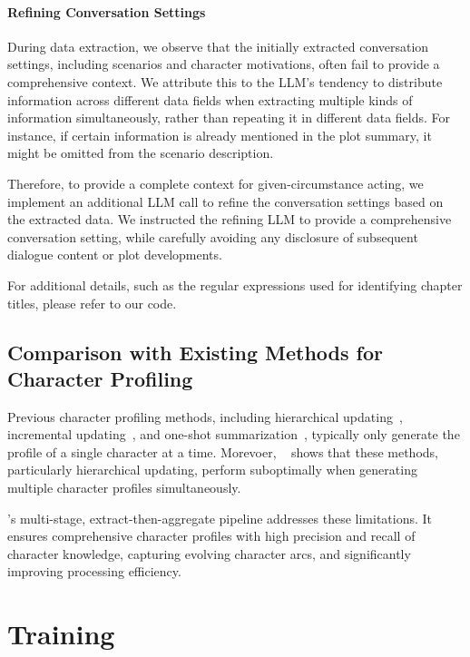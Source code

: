 \paragraph{Refining Conversation Settings} 
During data extraction, we observe that the initially extracted conversation settings, including scenarios and character motivations, often fail to provide a comprehensive context. 
We attribute this to the LLM’s tendency to distribute information across different data fields when extracting multiple kinds of information simultaneously, rather than repeating it in different data fields. 
For instance, if certain information is already mentioned in the plot summary, it might be omitted from the scenario description.

Therefore, to provide a complete context for given-circumstance acting, we implement an additional LLM call to refine the conversation settings based on the extracted data. 
We instructed the refining LLM to provide a comprehensive  conversation setting, while carefully avoiding any disclosure of subsequent dialogue content or plot developments. 


For additional details, such as the regular expressions used for identifying chapter titles, please refer to our  code.

\subsection{Comparison with Existing Methods for Character Profiling}

Previous character profiling methods, including hierarchical updating~\citep{wu2021recursively}, incremental updating~\citep{chang2023booookscore}, and one-shot summarization~\citep{yuan2024evaluating}, typically only generate the profile of a single character at a time. 
Morevoer, ~\citet{papoudakis2024bookworm} shows that these methods, particularly hierarchical updating, perform suboptimally when generating multiple character profiles simultaneously.

\method's multi-stage, extract-then-aggregate pipeline addresses these limitations. 
It ensures comprehensive character profiles with high precision and recall of character knowledge, capturing evolving character arcs, and significantly improving processing efficiency.

\section{Training}
\label{sec:app_training}


